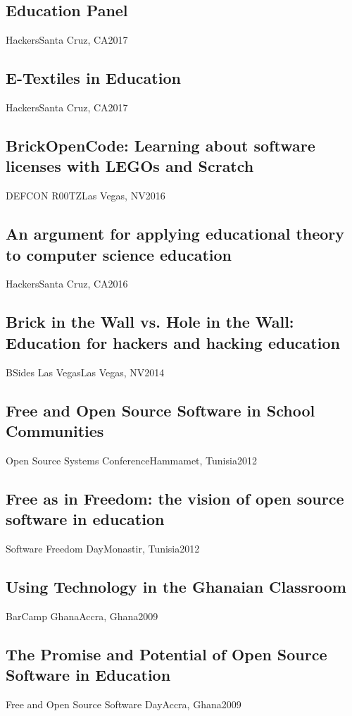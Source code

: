 \documentclass[../main.tex]{subfiles}
\begin{document}
\subsection{Education Panel}{Hackers}{Santa Cruz, CA}{2017}


\subsection{E-Textiles in Education}{Hackers}{Santa Cruz, CA}{2017}


	\subsection{BrickOpenCode: Learning about software licenses with LEGOs and Scratch}{DEFCON R00TZ}{Las Vegas, NV}{2016}


\subsection{An argument for applying educational theory to computer science education}{Hackers}{Santa Cruz, CA}{2016}


	\subsection{Brick in the Wall vs. Hole in the Wall: Education for hackers and hacking education}{BSides Las Vegas}{Las Vegas, NV}{2014}


	\subsection{Free and Open Source Software in School Communities}{Open Source Systems Conference}{Hammamet, Tunisia}{2012}


	\subsection{Free as in Freedom: the vision of open source software in education}{Software Freedom Day}{Monastir, Tunisia}{2012}


	\subsection{Using Technology in the Ghanaian Classroom}{BarCamp Ghana}{Accra, Ghana}{2009}


	\subsection{The Promise and Potential of Open Source Software in Education}{Free and Open Source Software Day}{Accra, Ghana}{2009}
	{}
\end{document}
